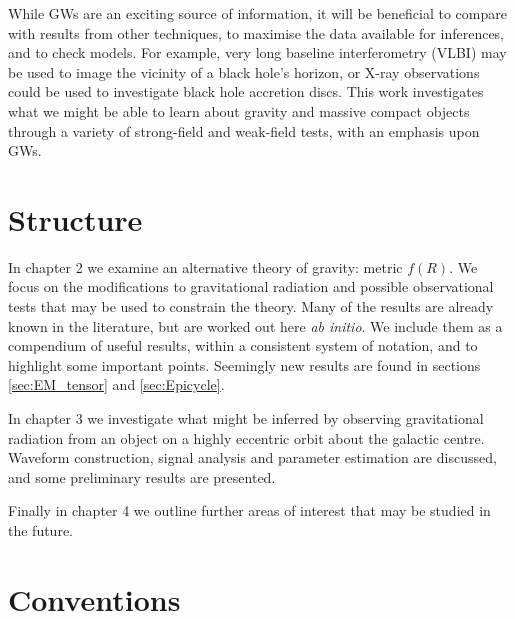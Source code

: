 While GWs are an exciting source of information, it will be beneficial to compare with results from other techniques, to maximise the data available for inferences, and to check models. For example, very long baseline interferometry (VLBI) may be used to image the vicinity of a black hole's horizon, or X-ray observations could be used to investigate black hole accretion discs\cite{Psaltis2008}. This work investigates what we might be able to learn about gravity and massive compact objects through a variety of strong-field and weak-field tests, with an emphasis upon GWs.

\section{Structure}

In chapter 2 we examine an alternative theory of gravity: metric $f(R)$. We focus on the modifications to gravitational radiation and possible observational tests that may be used to constrain the theory. Many of the results are already known in the literature, but are worked out here {\it ab initio}. We include them as a compendium of useful results, within a consistent system of notation, and to highlight some important points. Seemingly new results are found in sections \ref{sec:EM_tensor} and \ref{sec:Epicycle}.

In chapter 3 we investigate what might be inferred by observing gravitational radiation from an object on a highly eccentric orbit about the galactic centre. Waveform construction, signal analysis and parameter estimation are discussed, and some preliminary results are presented.

Finally in chapter 4 we outline further areas of interest that may be studied in the future.

\section{Conventions}

